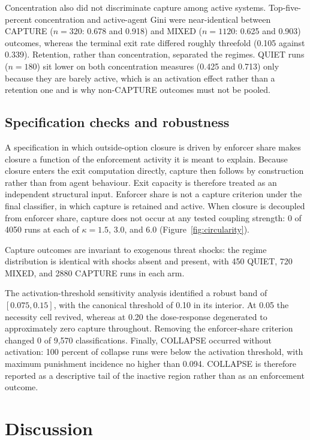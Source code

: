 \documentclass[12pt]{article}
\begin{document}
Concentration also did not discriminate capture among active systems. Top-five-percent concentration and active-agent Gini were near-identical between CAPTURE ($n=320$: 0.678 and 0.918) and MIXED ($n=1120$: 0.625 and 0.903) outcomes, whereas the terminal exit rate differed roughly threefold (0.105 against 0.339). Retention, rather than concentration, separated the regimes. QUIET runs ($n=180$) sit lower on both concentration measures (0.425 and 0.713) only because they are barely active, which is an activation effect rather than a retention one and is why non-CAPTURE outcomes must not be pooled.

\subsection{Specification checks and robustness}

A specification in which outside-option closure is driven by enforcer share makes closure a function of the enforcement activity it is meant to explain. Because closure enters the exit computation directly, capture then follows by construction rather than from agent behaviour. Exit capacity is therefore treated as an independent structural input. Enforcer share is not a capture criterion under the final classifier, in which capture is retained and active. When closure is decoupled from enforcer share, capture does not occur at any tested coupling strength: 0 of 4050 runs at each of $\kappa=1.5$, $3.0$, and $6.0$ (Figure~\ref{fig:circularity}).

Capture outcomes are invariant to exogenous threat shocks: the regime distribution is identical with shocks absent and present, with 450 QUIET, 720 MIXED, and 2880 CAPTURE runs in each arm.

The activation-threshold sensitivity analysis identified a robust band of $[0.075,0.15]$, with the canonical threshold of 0.10 in its interior. At 0.05 the necessity cell revived, whereas at 0.20 the dose-response degenerated to approximately zero capture throughout. Removing the enforcer-share criterion changed 0 of 9,570 classifications. Finally, COLLAPSE occurred without activation: 100 percent of collapse runs were below the activation threshold, with maximum punishment incidence no higher than 0.094. COLLAPSE is therefore reported as a descriptive tail of the inactive region rather than as an enforcement outcome.

\section{Discussion}
\end{document}
